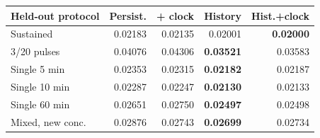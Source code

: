 \begin{tabular}{lrrrr}
\toprule
Held-out protocol & Persist. & + clock & History & Hist.+clock \\
\midrule
Sustained & 0.02183 & 0.02135 & 0.02001 & \textbf{0.02000} \\
3/20 pulses & 0.04076 & 0.04306 & \textbf{0.03521} & 0.03583 \\
Single 5 min & 0.02353 & 0.02315 & \textbf{0.02182} & 0.02187 \\
Single 10 min & 0.02287 & 0.02247 & \textbf{0.02130} & 0.02133 \\
Single 60 min & 0.02651 & 0.02750 & \textbf{0.02497} & 0.02498 \\
Mixed, new conc. & 0.02876 & 0.02743 & \textbf{0.02699} & 0.02734 \\
\bottomrule
\end{tabular}
